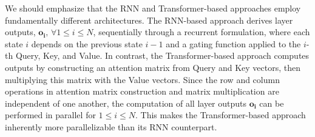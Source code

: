 \par We should emphasize that the RNN and Transformer-based approaches employ fundamentally different architectures. The RNN-based approach derives layer outputs, $\mathbf{o_i},\, \forall 1\leq i \leq N$, sequentially through a recurrent formulation, where each state $i$ depends on the previous state $i-1$ and a gating function applied to the $i$-th Query, Key, and Value. In contrast, the Transformer-based approach computes outputs by constructing an attention matrix from Query and Key vectors, then multiplying this matrix with the Value vectors. Since the row and column operations in attention matrix construction and matrix multiplication are independent of one another, the computation of all layer outputs $\mathbf{o_i}$ can be performed in parallel for $1\leq i \leq N$. This makes the Transformer-based approach inherently more parallelizable than its RNN counterpart.


